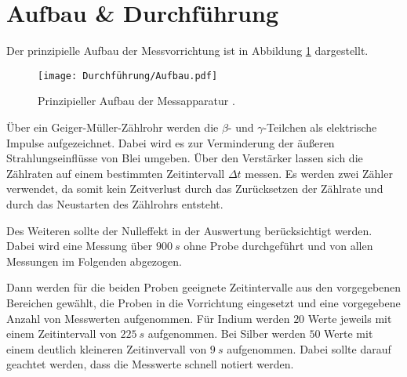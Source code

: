 \section{Aufbau \& Durchführung}
Der prinzipielle Aufbau der Messvorrichtung ist in Abbildung \ref{fig:aufbau} dargestellt.
\begin{figure}[h]
    \centering
    \texttt{[image: Durchführung/Aufbau.pdf]}
    \caption{Prinzipieller Aufbau der Messapparatur \cite{V702}.}
    \label{fig:aufbau}
\end{figure}
Über ein Geiger-Müller-Zählrohr werden die $\beta$- und $\gamma$-Teilchen als elektrische Impulse aufgezeichnet.
Dabei wird es zur Verminderung der äu\ss{}eren Strahlungseinflüsse von Blei umgeben.
Über den Verstärker lassen sich die Zählraten auf einem bestimmten Zeitintervall $\Delta t$ messen.
Es werden zwei Zähler verwendet, da somit kein Zeitverlust durch das Zurücksetzen der Zählrate und durch das Neustarten des Zählrohrs entsteht.

Des Weiteren sollte der Nulleffekt in der Auswertung berücksichtigt werden.
Dabei wird eine Messung über $\SI{900}{s}$ ohne Probe durchgeführt und von allen Messungen im Folgenden abgezogen.

Dann werden für die beiden Proben geeignete Zeitintervalle aus den vorgegebenen Bereichen gewählt, die Proben in die Vorrichtung eingesetzt und eine vorgegebene Anzahl von Messwerten aufgenommen.
Für Indium werden $20$ Werte jeweils mit einem Zeitintervall von $\SI{225}{s}$ aufgenommen.
Bei Silber werden $50$ Werte mit einem deutlich kleineren Zeitinvervall von $\SI{9}{s}$ aufgenommen.
Dabei sollte darauf geachtet werden, dass die Messwerte schnell notiert werden.
